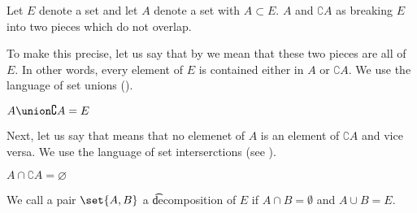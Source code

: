 

Let $E$ denote a set and let $A$ denote a set with $A \subset E$.
$A$ and $\complement{A}$ as breaking $E$ into two pieces which do not overlap.


To make this precise, let us say that by  we mean that these two pieces are all of $E$.
In other words, every element of $E$ is contained either in $A$ or $\complement{A}$.
We use the language of set unions ().

\begin{proposition}[Breaking]
  $A \union \complement{A} = E$
\end{proposition}

Next, let us say that  means that no elemenet of $A$ is an element of $\complement{A}$ and vice versa.
We use the language of set interserctions (see ).

\begin{proposition}
  $A \cap \complement{A} = \varnothing$
\end{proposition}


We call a pair $\set{A, B}$ a \t{decomposition} of $E$ if $A \cap B = \emptyset$ and $A \cup B = E$.
